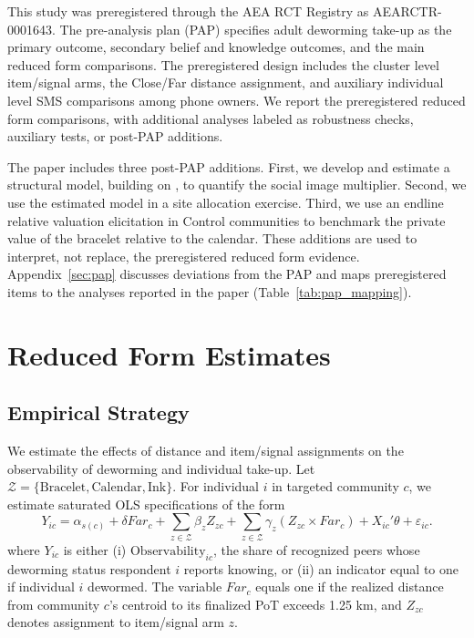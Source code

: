 \documentclass[ECM\space ReStud.tex]{subfiles}
\begin{document}
This study was preregistered through the AEA RCT Registry as AEARCTR-0001643. The pre-analysis plan (PAP) specifies adult deworming take-up as the primary outcome, secondary belief and knowledge outcomes, and the main reduced form comparisons. The preregistered design includes the cluster level item/signal arms, the Close/Far distance assignment, and auxiliary individual level SMS comparisons among phone owners. We report the preregistered reduced form comparisons, with additional analyses labeled as robustness checks, auxiliary tests, or post-PAP additions.

The paper includes three post-PAP additions. First, we develop and estimate a structural model, building on \citet{Benabou_laws_2011}, to quantify the social image multiplier. Second, we use the estimated model in a site allocation exercise. Third, we use an endline relative valuation elicitation in Control communities to benchmark the private value of the bracelet relative to the calendar. These additions are used to interpret, not replace, the preregistered reduced form evidence. Appendix~\ref{sec:pap} discusses deviations from the PAP and maps preregistered items to the analyses reported in the paper (Table~\ref{tab:pap_mapping}).

 \section{Reduced Form Estimates} \label{reduced-form-results}

\subsection{Empirical Strategy}

We estimate the effects of distance and item/signal assignments on the observability of deworming and individual take-up. Let \(\mathcal{Z}=\{\text{Bracelet},\text{Calendar},\text{Ink}\}\). For individual \(i\) in targeted community \(c\), we estimate saturated OLS specifications of the form
\[
Y_{ic}
=
\alpha_{s(c)}
+\delta Far_c
+\sum_{z\in\mathcal{Z}}\beta_z Z_{zc}
+\sum_{z\in\mathcal{Z}}\gamma_z \left(Z_{zc}\times Far_c\right)
+X_{ic}'\theta
+\varepsilon_{ic}.
\]
where \(Y_{ic}\) is either (i) \(\text{Observability}_{ic}\), the share of recognized peers whose deworming status respondent \(i\) reports knowing, or (ii) an indicator equal to one if individual \(i\) dewormed. The variable \(Far_c\) equals one if the realized distance from community \(c\)'s centroid to its finalized PoT exceeds 1.25 km, and \(Z_{zc}\) denotes assignment to item/signal arm \(z\).
\end{document}
